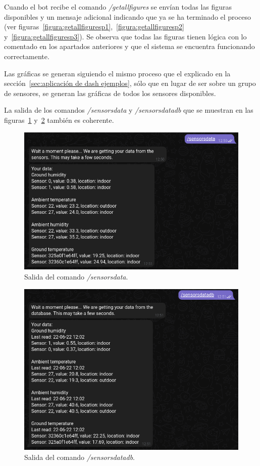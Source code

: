 \documentclass[a4paper, 12pt, oneside]{book}
\begin{document}
Cuando el bot recibe el comando \textit{/getallfigures} se envían todas las figuras disponibles y un mensaje adicional indicando que ya se ha terminado el proceso (ver figuras~\ref{figura:getallfiguresp1},~\ref{figura:getallfiguresp2} y~\ref{figura:getallfiguresp3}).
 Se observa que todas las figuras tienen lógica con lo comentado en los apartados anteriores y que el sistema se encuentra funcionando correctamente.
 
Las gráficas se generan siguiendo el mismo proceso que el explicado en la sección~\ref{sec:aplicación de dash ejemplos}, sólo que en lugar de ser sobre un grupo de sensores, se generan las gráficas de todos los sensores disponibles.
 
La salida de los comandos \textit{/sensorsdata} y \textit{/sensorsdatadb} que se muestran en las figuras~\ref{figura:sensorsdata} y~\ref{figura:sensorsdatadb} también es coherente.

\begin{figure}[H]
	\centering
    \includegraphics[width=12cm, keepaspectratio]{img/sensorsdata}
    \caption{Salida del comando \textit{/sensorsdata}.}
    \label{figura:sensorsdata}
\end{figure}

\begin{figure}[H]
	\centering
    \includegraphics[width=12cm, keepaspectratio]{img/sensorsdatadb}
    \caption{Salida del comando \textit{/sensorsdatadb}.}
    \label{figura:sensorsdatadb}
\end{figure}
\end{document}
